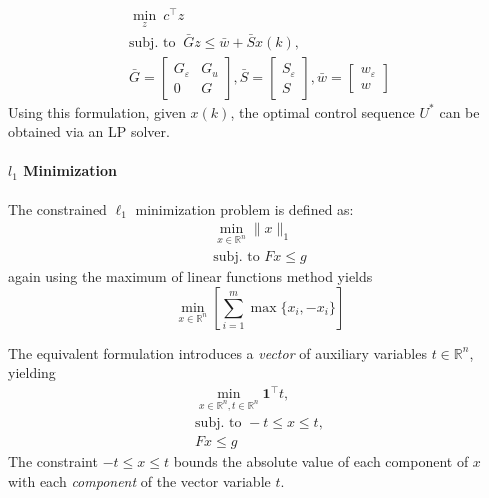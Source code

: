 \begin{gather*}
    \min_z \              c^\top z                                                                                                                                                              \\
    \text{subj.\ to } \   \bar{G} z \leq \bar{w} + \bar{S} x(k),                                                                                                                                \\
    \bar{G}               = \begin{bmatrix} G_\varepsilon & G_u \\ 0 & G\end{bmatrix}, \bar{S} = \begin{bmatrix} S_\varepsilon \\ S \end{bmatrix}, \bar{w}= \begin{bmatrix} w_\varepsilon \\ w \end{bmatrix}
\end{gather*}
Using this formulation, given $x(k)$, the optimal control sequence $U^*$ can be obtained via an LP solver.

\paragraph[l1 Minimization]{$l_{1}$ Minimization}

The constrained \(\ell_1\) minimization problem is defined as:
\begin{gather*}
    \min_{x \in \mathbb{R}^n} \|x\|_1 \\
    \text{subj.\ to } Fx \leq g
\end{gather*}
again using the maximum of linear functions method yields
\begin{equation*}
    \min_{x \in \mathbb{R}^n} \left[ \sum_{i=1}^{m} \max \{x_i, -x_i\} \right]
\end{equation*}

\newpar{}

The equivalent formulation introduces a \textit{vector} of auxiliary variables $t \in \mathbb{R}^n$, yielding
\begin{gather*}
    \min_{x \in \mathbb{R}^n, t \in \mathbb{R}^n} \mathbf{1}^\top t, \\
    \text{subj.\ to } -t \leq x \leq t, \\
    Fx \leq g
\end{gather*}
The constraint $-t \leq x \leq t$ bounds the absolute value of each component of $x$ with each \textit{component} of the vector variable $t$.

